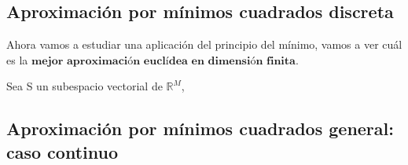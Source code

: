 \subsection{Aproximación por mínimos cuadrados discreta}
Ahora vamos a estudiar una aplicación del principio del mínimo, vamos a ver cuál es la $\textbf{mejor aproximación euclídea en dimensión finita.}$

Sea S un subespacio vectorial de $\mathbb{R}^M$, %


\subsection{Aproximación por mínimos cuadrados general: caso continuo}